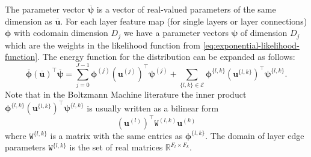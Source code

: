 \documentclass{article} %
\begin{document}
The parameter vector $\overline{\boldsymbol{\psi}}$ is a vector of
real-valued parameters of the same dimension as
$\overline{\mathbf{u}}$.  For each layer feature map (for single
layers or layer connections) $\boldsymbol{\phi}$ with codomain
dimension $D_j$ we have a parameter vectors $\boldsymbol{\psi}$ of
dimension $D_j$ which are the weights in the likelihood function from
\autoref{eq:exponential-likelihood-function}.  The energy function for the distribution can be expanded as follows:
\begin{equation}
\overline{\boldsymbol{\phi}}(\overline{\mathbf{u}})^\top \overline{\boldsymbol{\psi}} = \sum_{j=0}^{J-1} \boldsymbol{\phi}^{(j)}(\mathbf{u}^{(j)})^\top \boldsymbol{\psi}^{(j)} + \sum_{\{l,k\}\in\mathcal{E}} \boldsymbol{\phi}^{\{l,k\}}(\mathbf{u}^{\{l,k\}})^\top \boldsymbol{\psi}^{\{l,k\}}.
\end{equation}
Note that in the Boltzmann Machine literature the inner product $\boldsymbol{\phi}^{\{l,k\}}(\mathbf{u}^{\{l,k\}})^\top \boldsymbol{\psi}^{\{l,k\}}$
is usually written as a bilinear form
\begin{equation}
(\mathbf{u}^{(l)})^\top \mathtt{W}^{(l,k)} \mathbf{u}^{(k)}
\end{equation}
where $\mathtt{W}^{\{l,k\}}$ is a matrix with the same entries as $\boldsymbol{\phi}^{\{l,k\}}$. The domain of
layer edge parameters $\mathtt{W}^{\{l,k\}}$ is the set of real matrices $\mathbb{R}^{F_l\times F_k}$.  
\end{document}
